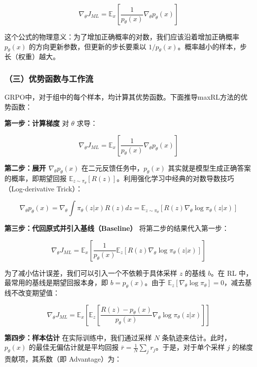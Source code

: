 \[
\nabla_\theta J_{ML}=\mathbb{E}_x\left[\frac{1}{p_\theta(x)}\nabla_\theta p_\theta(x)\right]
\]

这个公式的物理意义：为了增加正确概率的对数，我们应该沿着增加正确概率 \(p_\theta(x)\) 的方向更新参数，但更新的步长要乘以 \(1/p_\theta(x)\)。概率越小的样本，步长（权重）越大。

\hypertarget{ux4e09ux4f18ux52bfux51fdux6570ux4e0eux5de5ux4f5cux6d41}{%
\subsubsection{（三）优势函数与工作流}\label{ux4e09ux4f18ux52bfux51fdux6570ux4e0eux5de5ux4f5cux6d41}}

GRPO中，对于组中的每个样本，均计算其优势函数。下面推导maxRL方法的优势函数：

\textbf{第一步：计算梯度} 对 \(\theta\) 求导：

\[
\nabla_\theta J_{ML}=\mathbb{E}_x\left[\frac{1}{p_\theta(x)}\nabla_\theta p_\theta(x)\right]
\]

\textbf{第二步：展开 \(\nabla_\theta p_\theta(x)\)} 在二元反馈任务中，\(p_\theta(x)\) 其实就是模型生成正确答案的概率，即期望回报 \(\mathbb{E}_{z\sim\pi_\theta}[R(z)]\)。利用强化学习中经典的对数导数技巧（Log-derivative Trick）：

\[
\nabla_\theta p_\theta(x)=\nabla_\theta\int \pi_\theta(z|x)R(z)dz
=\mathbb{E}_{z\sim\pi_\theta}\left[R(z)\nabla_\theta\log \pi_\theta(z|x)\right]
\]

\textbf{第三步：代回原式并引入基线（Baseline）} 将第二步的结果代入第一步：

\[
\nabla_\theta J_{ML}=\mathbb{E}_x\left[\frac{1}{p_\theta(x)}\mathbb{E}_z\left[R(z)\nabla_\theta\log \pi_\theta(z|x)\right]\right]
\]

为了减小估计误差，我们可以引入一个不依赖于具体采样 \(z\) 的基线 \(b\)。在 RL 中，最常用的基线是期望回报本身，即 \(b=p_\theta(x)\)。由于 \(\mathbb{E}_z[\nabla_\theta\log\pi_\theta]=0\)，减去基线不改变期望值：

\[
\nabla_\theta J_{ML}=\mathbb{E}_x\left[\mathbb{E}_z\left[\frac{R(z)-p_\theta(x)}{p_\theta(x)}\nabla_\theta\log\pi_\theta(z|x)\right]\right]
\]

\textbf{第四步：样本估计} 在实际训练中，我们通过采样 \(N\) 条轨迹来估计。此时，\(p_\theta(x)\) 的最佳无偏估计就是平均回报 \(\bar{r}=\frac{1}{N}\sum_j r_j\)。于是，对于单个采样 \(j\) 的梯度贡献项，其系数（即 Advantage）为：

